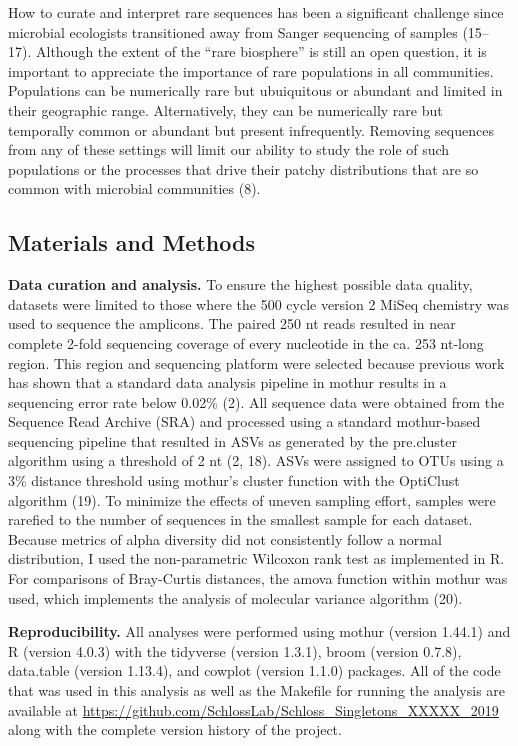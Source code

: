 \documentclass[
]{article}
\begin{document}
How to curate and interpret rare sequences has been a significant
challenge since microbial ecologists transitioned away from Sanger
sequencing of samples (15--17). Although the extent of the ``rare
biosphere'' is still an open question, it is important to appreciate the
importance of rare populations in all communities. Populations can be
numerically rare but ubuiquitous or abundant and limited in their
geographic range. Alternatively, they can be numerically rare but
temporally common or abundant but present infrequently. Removing
sequences from any of these settings will limit our ability to study the
role of such populations or the processes that drive their patchy
distributions that are so common with microbial communities (8).

\hypertarget{materials-and-methods}{%
\subsection{Materials and Methods}\label{materials-and-methods}}

\textbf{Data curation and analysis.} To ensure the highest possible data
quality, datasets were limited to those where the 500 cycle version 2
MiSeq chemistry was used to sequence the amplicons. The paired 250 nt
reads resulted in near complete 2-fold sequencing coverage of every
nucleotide in the ca. 253 nt-long region. This region and sequencing
platform were selected because previous work has shown that a standard
data analysis pipeline in mothur results in a sequencing error rate
below 0.02\% (2). All sequence data were obtained from the Sequence Read
Archive (SRA) and processed using a standard mothur-based sequencing
pipeline that resulted in ASVs as generated by the pre.cluster algorithm
using a threshold of 2 nt (2, 18). ASVs were assigned to OTUs using a
3\% distance threshold using mothur's cluster function with the
OptiClust algorithm (19). To minimize the effects of uneven sampling
effort, samples were rarefied to the number of sequences in the smallest
sample for each dataset. Because metrics of alpha diversity did not
consistently follow a normal distribution, I used the non-parametric
Wilcoxon rank test as implemented in R. For comparisons of Bray-Curtis
distances, the amova function within mothur was used, which implements
the analysis of molecular variance algorithm (20).

\textbf{Reproducibility.} All analyses were performed using mothur
(version 1.44.1) and R (version 4.0.3) with the tidyverse (version
1.3.1), broom (version 0.7.8), data.table (version 1.13.4), and cowplot
(version 1.1.0) packages. All of the code that was used in this analysis
as well as the Makefile for running the analysis are available at
\url{https://github.com/SchlossLab/Schloss_Singletons_XXXXX_2019} along
with the complete version history of the project.
\end{document}
